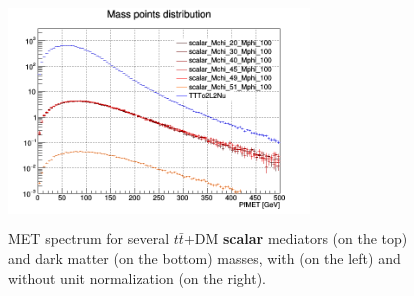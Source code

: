 \documentclass[a4paper, 10pt, openright]{report}
\begin{document}
\begin{figure}[htbp]
{\begin{minipage}[b]{.48\textwidth}
\includegraphics[width=8cm, height=6cm]{figs/scalarMETmChiLarge.png}
\end{minipage} \hfill
}
\caption{\ac{MET} spectrum for several $t \bar t$+DM \textbf{scalar} mediators (on the top) and dark matter (on the bottom) masses, with (on the left) and without unit normalization (on the right).}
\label{fig:signalScalar}
\end{figure}
\end{document}
